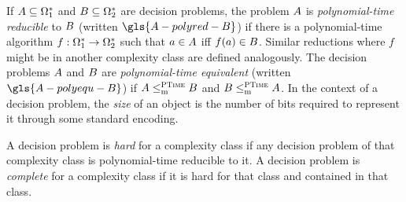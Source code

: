 
If $A \subseteq \Omega^{*}_1$ and $B \subseteq \Omega^{*}_2$ are
decision problems, the problem $A$ is \emph{polynomial-time reducible} to
$B$ (written $\gls{A-polyred-B}$) if there is a polynomial-time algorithm
$f : \Omega^{*}_1 \to \Omega^{*}_2$ such that $a \in A$ iff
$f(a) \in B$.
Similar reductions where $f$ might be in another complexity class are defined
analogously.
The decision problems $A$ and $B$ are \emph{polynomial-time equivalent}
(written $\gls{A-polyequ-B}$) if $A \leq_{\mathrm{m}}^{\text{\normalfont{\scshape PTime}}} B$ and $B \leq_{\mathrm{m}}^{\text{\normalfont{\scshape PTime}}} A$.
In the context of a decision problem, the \emph{size} of an object is the number
of bits required to represent it through some standard encoding.

A decision problem is \emph{hard} for a complexity class if any decision problem
of that complexity class is polynomial-time reducible to it.
A decision problem is \emph{complete} for a complexity class if it is hard for
that class and contained in that class.